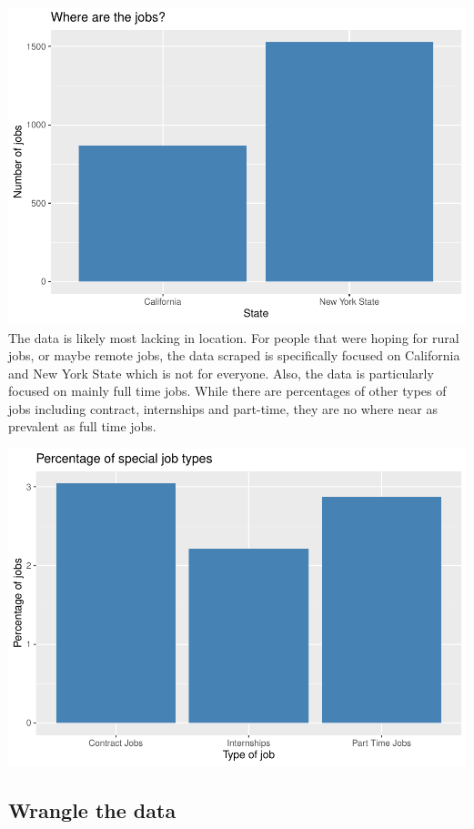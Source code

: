 \documentclass[
]{article}
\begin{document}
\includegraphics{main_files/figure-latex/unnamed-chunk-3-1.pdf} The data
is likely most lacking in location. For people that were hoping for
rural jobs, or maybe remote jobs, the data scraped is specifically
focused on California and New York State which is not for everyone.
Also, the data is particularly focused on mainly full time jobs. While
there are percentages of other types of jobs including contract,
internships and part-time, they are no where near as prevalent as full
time jobs.

\includegraphics{main_files/figure-latex/unnamed-chunk-4-1.pdf}

\hypertarget{wrangle-the-data}{%
\subsection{Wrangle the data}\label{wrangle-the-data}}
\end{document}
